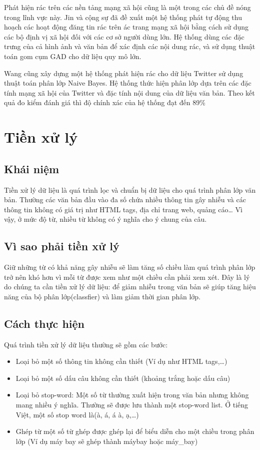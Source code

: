 Phát hiện rác trên các nền tảng mạng xã hội cũng là một trong các chủ đề nóng trong lĩnh vực này. Jin và cộng sự\cite{jin} đã đề xuất một hệ thống phát tự động thu hoạch các hoạt động đăng tin rác trên ác trang mạng xã hội bằng cách sử dụng các bộ định vị xã hội đối với các cơ sở người dùng lớn. Hệ thống dùng các đặc trưng của cả hình ảnh và văn bản để xác định các nội dung rác, và sử dụng thuật toán gom cụm GAD cho dữ liệu quy mô lớn.

Wang cũng xây dựng một hệ thống phát hiện rác cho dữ liệu Twitter sử dụng thuật toán phân lớp Naive Bayes. Hệ thống thức hiện phân lớp dựa trên các đặc tính mạng xã hội của Twitter và đặc tính nội dung của dữ liệu văn bản. Theo kết quả đo kiểm đánh giá thì độ chính xác của hệ thống đạt đến 89\%\cite{5741690}

\section{Tiền xử lý}
\subsection{Khái niệm}
Tiền xử lý dữ liệu là quá trình lọc và chuẩn bị dữ liệu cho quá trình phân lớp văn bản. Thường các văn bản đầu vào đa số chứa nhiều thông tin gây nhiễu và các thông tin không có giá trị như HTML tags, địa chỉ trang web, quảng cáo… Vì vậy, ở mức độ từ, nhiều từ không có ý nghĩa cho ý chung của câu.
\subsection{Vì sao phải tiền xử lý}
Giữ những từ có khả năng gây nhiễu sẽ làm tăng số chiều làm quá trình phân lớp trở nên khó hơn vì mỗi từ được xem như một chiều cần phải xem xét. Đây là lý do chúng ta cần tiền xử lý dữ liệu: để giảm nhiễu trong văn bản sẽ giúp tăng hiệu năng của bộ phân lớp(classfier) và làm giảm thời gian phân lớp.
\subsection{Cách thực hiện}
Quá trình tiền xử lý dữ liệu thường sẽ gồm các bước:
\begin{itemize}
  \item Loại bỏ một số thông tin không cần thiết (Ví dụ như HTML tags,…)
  \item Loại bỏ một số dấu câu không cần thiết (khoảng trắng hoặc dấu câu)
  \item Loại bỏ stop-word: Một số từ thường xuất hiện trong văn bản nhưng không mang nhiều ý nghĩa. Thường sẽ được lưu thành một stop-word list. Ở tiếng Việt, một số stop word là(à, á, á à, ạ,…)
  \item Ghép từ một số từ ghép được ghép lại để biểu diễn cho một chiều trong phân lớp (Ví dụ máy bay sẽ ghép thành máybay hoặc máy\_bay)
\end{itemize}
